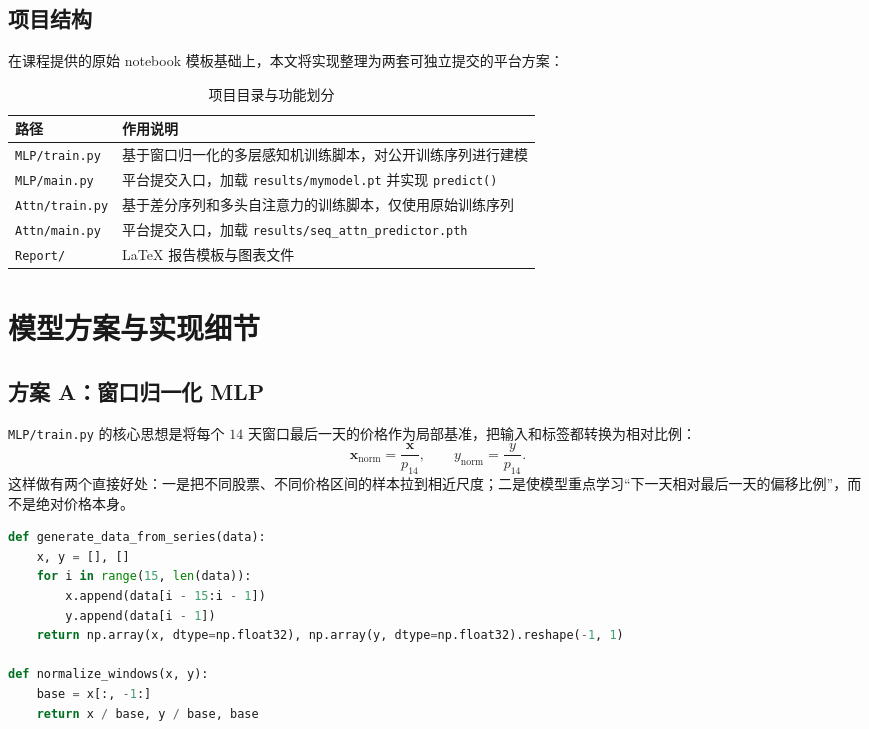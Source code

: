 \subsection{项目结构}

在课程提供的原始 notebook 模板基础上，本文将实现整理为两套可独立提交的平台方案：
\begin{table}[H]
    \centering
    \caption{项目目录与功能划分}
    \begin{tabular}{p{3.6cm}p{9.6cm}}
        \toprule
        路径 & 作用说明 \\
        \midrule
        \texttt{MLP/train.py} & 基于窗口归一化的多层感知机训练脚本，对公开训练序列进行建模 \\
        \texttt{MLP/main.py} & 平台提交入口，加载 \texttt{results/mymodel.pt} 并实现 \texttt{predict()} \\
        \texttt{Attn/train.py} & 基于差分序列和多头自注意力的训练脚本，仅使用原始训练序列 \\
        \texttt{Attn/main.py} & 平台提交入口，加载 \texttt{results/seq\_attn\_predictor.pth} \\
        \texttt{Report/} & \LaTeX{} 报告模板与图表文件 \\
        \bottomrule
    \end{tabular}
\end{table}

\section{模型方案与实现细节}

\subsection{方案 A：窗口归一化 MLP}

\texttt{MLP/train.py} 的核心思想是将每个 $14$ 天窗口最后一天的价格作为局部基准，把输入和标签都转换为相对比例：
\begin{equation}
\mathbf{x}_{\mathrm{norm}} = \frac{\mathbf{x}}{p_{14}}, \qquad
y_{\mathrm{norm}} = \frac{y}{p_{14}}.
\end{equation}
这样做有两个直接好处：一是把不同股票、不同价格区间的样本拉到相近尺度；二是使模型重点学习“下一天相对最后一天的偏移比例”，而不是绝对价格本身。

\begin{lstlisting}[language=Python,caption={MLP 方案的样本构造与窗口归一化}]
def generate_data_from_series(data):
    x, y = [], []
    for i in range(15, len(data)):
        x.append(data[i - 15:i - 1])
        y.append(data[i - 1])
    return np.array(x, dtype=np.float32), np.array(y, dtype=np.float32).reshape(-1, 1)

def normalize_windows(x, y):
    base = x[:, -1:]
    return x / base, y / base, base
\end{lstlisting}

